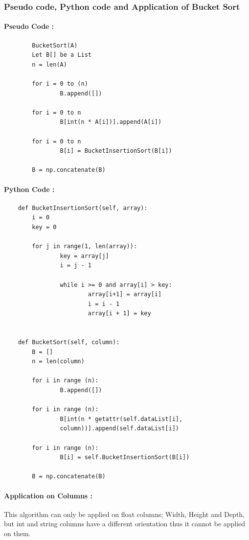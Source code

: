 \documentclass[12pt]{article}
\begin{document}
    \newpage
    \subsubsection{Pseudo code, Python code and Application of Bucket Sort}
    \paragraph{Pseudo Code :}
    \begin{verbatim}
        BucketSort(A)
        Let B[] be a List
        n = len(A)

        for i = 0 to (n)
                B.append([])

        for i = 0 to n
                B[int(n * A[i])].append(A[i])

        for i = 0 to n
                B[i] = BucketInsertionSort(B[i])

        B = np.concatenate(B)

    \end{verbatim}
    \paragraph{Python Code :}
    \begin{verbatim}
    def BucketInsertionSort(self, array):
        i = 0
        key = 0

        for j in range(1, len(array)):
                key = array[j]
                i = j - 1
        
                while i >= 0 and array[i] > key:
                        array[i+1] = array[i]
                        i = i - 1 
                        array[i + 1] = key


    def BucketSort(self, column):
        B = []
        n = len(column)

        for i in range (n):
                B.append([])

        for i in range (n):
                B[int(n * getattr(self.dataList[i],
                column))].append(self.dataList[i])

        for i in range (n):
                B[i] = self.BucketInsertionSort(B[i])

        B = np.concatenate(B)
    \end{verbatim}
    \paragraph{Application on Columns :} 
    This algorithm can only be applied on float columns; Width, Height and Depth, but int and string columns have a different orientation thus it cannot be applied on them.
    
\end{document}
